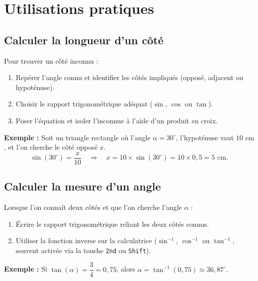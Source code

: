 \documentclass[11pt,a4paper]{article}
\newcommand{\dec}{{,}} %
\begin{document}
\section{Utilisations pratiques}

\subsection{Calculer la longueur d'un côté}

\begin{methode}
Pour trouver un côté inconnu :
\begin{enumerate}
  \item Repérer l'angle connu et identifier les côtés impliqués (opposé, adjacent ou hypoténuse).
  \item Choisir le rapport trigonométrique adéquat ($\sin$, $\cos$ ou $\tan$).
  \item Poser l'équation et isoler l'inconnue à l'aide d'un produit en croix.
\end{enumerate}
\end{methode}

\textbf{Exemple :} Soit un triangle rectangle où l'angle $\alpha = 30^\circ$, l'hypoténuse vaut $10\text{ cm}$, et l'on cherche le côté opposé $x$.
\[
\sin(30^\circ) = \frac{x}{10} \quad\Longrightarrow\quad x = 10 \times \sin(30^\circ) = 10 \times 0\dec 5 = 5\text{ cm}.
\]

\subsection{Calculer la mesure d'un angle}

\begin{methode}
Lorsque l'on connaît deux côtés et que l'on cherche l'angle $\alpha$ :
\begin{enumerate}
  \item Écrire le rapport trigonométrique reliant les deux côtés connus.
  \item Utiliser la fonction inverse sur la calculatrice ($\sin^{-1}$, $\cos^{-1}$ ou $\tan^{-1}$, souvent activée via la touche \texttt{2nd} ou \texttt{Shift}).
\end{enumerate}
\end{methode}

\textbf{Exemple :} Si $\tan(\alpha) = \dfrac{3}{4} = 0\dec 75$, alors $\alpha = \tan^{-1}(0\dec 75) \approx 36\dec 87^\circ$.
\end{document}
